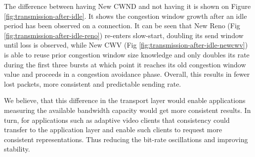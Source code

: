 \documentclass[10pt,sigconf,anonymous]{acmart}
\begin{document}
The difference between having New CWND and not having it is shown on Figure \ref{fig:transmission-after-idle}. It shows the congestion window growth after an idle period has been observed on a connection. It can be seen that New Reno (Fig \ref{fig:transmission-after-idle-reno}) re-enters slow-start, doubling its send window until loss is observed, while New CWV (Fig \ref{fig:transmission-after-idle-newcwv}) is able to reuse prior congestion window size knowledge and only doubles its rate during the first three bursts at which point it reaches its old congestion window value and proceeds in a congestion avoidance phase. Overall, this results in fewer lost packets, more consistent and predictable sending rate.

We believe, that this difference in the transport layer would enable applications measuring the available bandwidth capacity would get more consistent results. In turn, for applications such as adaptive video clients that consistency could transfer to the application layer and enable such clients to request more consistent representations. Thus reducing the bit-rate oscillations and improving stability.



\end{document}
